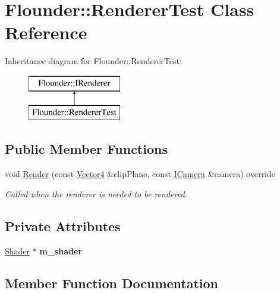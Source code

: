 \hypertarget{class_flounder_1_1_renderer_test}{}\section{Flounder\+:\+:Renderer\+Test Class Reference}
\label{class_flounder_1_1_renderer_test}
Inheritance diagram for Flounder\+:\+:Renderer\+Test\+:\begin{figure}[H]
\begin{center}
\leavevmode
\includegraphics[height=2.000000cm]{class_flounder_1_1_renderer_test}
\end{center}
\end{figure}
\subsection*{Public Member Functions}
\begin{DoxyCompactItemize}
\item 
void \hyperlink{class_flounder_1_1_renderer_test_ac2f0fc96a55b781fd401ad4f0fbde851}{Render} (const \hyperlink{class_flounder_1_1_vector4}{Vector4} \&clip\+Plane, const \hyperlink{class_flounder_1_1_i_camera}{I\+Camera} \&camera) override
\begin{DoxyCompactList}\small\item\em Called when the renderer is needed to be rendered. \end{DoxyCompactList}\end{DoxyCompactItemize}
\subsection*{Private Attributes}
\begin{DoxyCompactItemize}
\item 
\mbox{\label{class_flounder_1_1_renderer_test_aec000743ecd810182b92914916c1e878}} 
\hyperlink{class_flounder_1_1_shader}{Shader} $\ast$ {\bfseries m\+\_\+shader}
\end{DoxyCompactItemize}


\subsection{Member Function Documentation}
\mbox{\label{class_flounder_1_1_renderer_test_ac2f0fc96a55b781fd401ad4f0fbde851}} 
